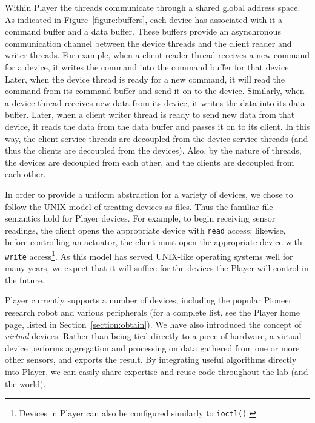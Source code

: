 Within Player the threads communicate through a shared global
address space.  As indicated in Figure~\ref{figure:buffers}, each
device has associated with it a command buffer and a data buffer.
These buffers
provide an asynchronous communication channel between the device
threads and the client reader and writer threads.  For example, when
a client reader thread receives a new command for a device,
it writes the command into the command buffer for that device.
Later, when the device thread is ready for a new
command, it will read the command from its command buffer and send
it on to the device.  Similarly, when a device thread receives
new data from its device, it writes the data into its data
buffer.  Later, when a client writer thread is ready to send new
data from that device, it reads the data from the data
buffer and passes it on to its client.  In this way, the client
service threads are decoupled from the device service threads (and
thus the clients are decoupled from the devices).  Also, by the
nature of threads, the devices are decoupled from each other,
and the clients are decoupled from each other.

In order to provide a uniform abstraction for a variety of devices, we
chose to follow the UNIX model of treating devices as files.  Thus the
familiar file semantics hold for Player devices.  For example, to
begin receiving sensor readings, the client opens the appropriate
device with {\tt read} access; likewise, before controlling an
actuator, the client must open the appropriate device with {\tt write}
access\footnote{Devices in Player can also be configured similarly
to {\tt ioctl()}.}.  
As this model has served UNIX-like operating systems well for
many years, we expect that it will suffice for the devices the Player
will control in the future.

Player currently supports a number of devices, including the
popular Pioneer research robot and various peripherals (for a complete
list, see the Player home page, listed in Section~\ref{section:obtain}).
We have also introduced the concept of {\sl virtual} devices.  Rather
than being tied directly to a piece of hardware, a virtual device performs
aggregation and processing on data gathered from one or more other sensors,
and exports the result.  By integrating useful algorithms directly
into Player, we can easily share expertise and reuse code 
throughout the lab (and the world).


